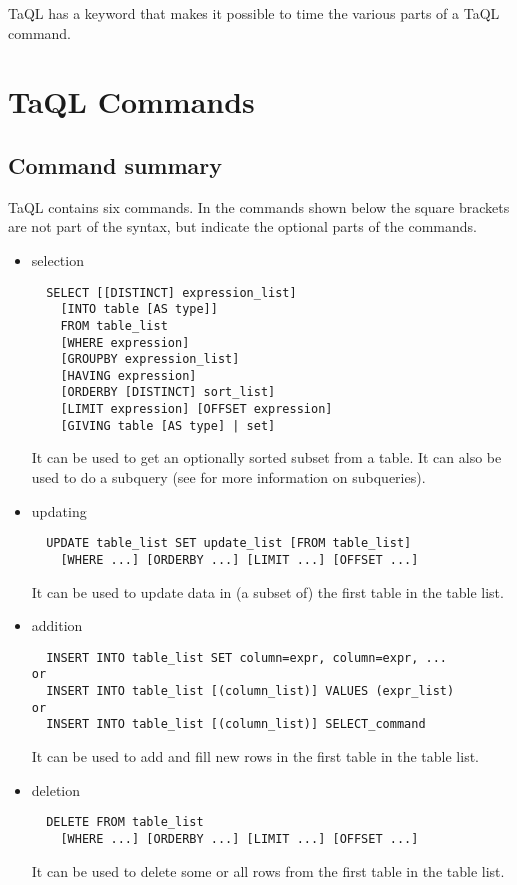 TaQL has a keyword that makes it possible to time the various parts of
a TaQL command.


\section{TaQL Commands}
\subsection{Command summary}
TaQL contains six commands.
In the commands shown below the square brackets are not part of the
syntax, but indicate the optional parts of the commands.

\begin{itemize}
\item selection
\begin{verbatim}
  SELECT [[DISTINCT] expression_list]
    [INTO table [AS type]]
    FROM table_list
    [WHERE expression]
    [GROUPBY expression_list]
    [HAVING expression]
    [ORDERBY [DISTINCT] sort_list]
    [LIMIT expression] [OFFSET expression]
    [GIVING table [AS type] | set]
\end{verbatim}
It can be used to get an optionally sorted subset from a table. It can
also be used to do a subquery (see  
for more information on subqueries).

\item updating
\begin{verbatim}
  UPDATE table_list SET update_list [FROM table_list]
    [WHERE ...] [ORDERBY ...] [LIMIT ...] [OFFSET ...]
\end{verbatim}
It can be used to update data in (a subset of) the first table in the
table list. 

\item addition
\begin{verbatim}
  INSERT INTO table_list SET column=expr, column=expr, ...
or
  INSERT INTO table_list [(column_list)] VALUES (expr_list)
or
  INSERT INTO table_list [(column_list)] SELECT_command
\end{verbatim}
It can be used to add and fill new rows in the first table in the
table list.

\item deletion
\begin{verbatim}
  DELETE FROM table_list
    [WHERE ...] [ORDERBY ...] [LIMIT ...] [OFFSET ...]
\end{verbatim}
It can be used to delete some or all rows from the first table
in the table list.


\end{itemize}
